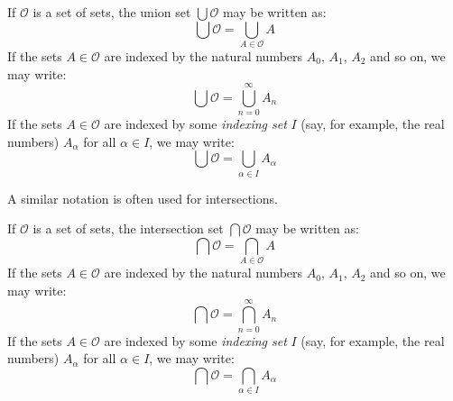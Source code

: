            \begin{notation}
                If $\mathcal{O}$ is a set of sets, the union set
                $\bigcup\mathcal{O}$ may be written as:
                \begin{equation}
                    \bigcup\mathcal{O}=\bigcup_{A\in\mathcal{O}}A
                \end{equation}
                If the sets $A\in\mathcal{O}$ are indexed by the natural
                numbers $A_{0}$, $A_{1}$, $A_{2}$ and so on, we may write:
                \begin{equation}
                    \bigcup\mathcal{O}=\bigcup_{n=0}^{\infty}A_{n}
                \end{equation}
                If the sets $A\in\mathcal{O}$ are indexed by some
                \textit{indexing set} $I$ (say, for example, the real numbers)
                $A_{\alpha}$ for all $\alpha\in{I}$, we may write:
                \begin{equation}
                    \bigcup\mathcal{O}=\bigcup_{\alpha\in{I}}A_{\alpha}
                \end{equation}
            \end{notation}
            A similar notation is often used for intersections.
            \begin{notation}
                If $\mathcal{O}$ is a set of sets, the intersection set
                $\bigcap\mathcal{O}$ may be written as:
                \begin{equation}
                    \bigcap\mathcal{O}=\bigcap_{A\in\mathcal{O}}A
                \end{equation}
                If the sets $A\in\mathcal{O}$ are indexed by the natural
                numbers $A_{0}$, $A_{1}$, $A_{2}$ and so on, we may write:
                \begin{equation}
                    \bigcap\mathcal{O}=\bigcap_{n=0}^{\infty}A_{n}
                \end{equation}
                If the sets $A\in\mathcal{O}$ are indexed by some
                \textit{indexing set} $I$ (say, for example, the real numbers)
                $A_{\alpha}$ for all $\alpha\in{I}$, we may write:
                \begin{equation}
                    \bigcap\mathcal{O}=\bigcap_{\alpha\in{I}}A_{\alpha}
                \end{equation}
            \end{notation}
